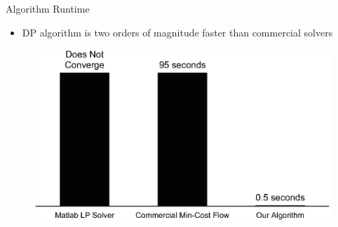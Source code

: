 \documentclass[aspectratio=43]{beamer}
\begin{document}
		\begin{frame}{Algorithm Runtime}
			\begin{itemize}
				\item DP algorithm is two orders of magnitude faster than commercial solvers
			\end{itemize}
			\begin{figure}
				\centering
				\includegraphics[width=0.75\linewidth]{figures/experiments/runtime.eps}
			\end{figure}
		\end{frame}
		
\end{document}
